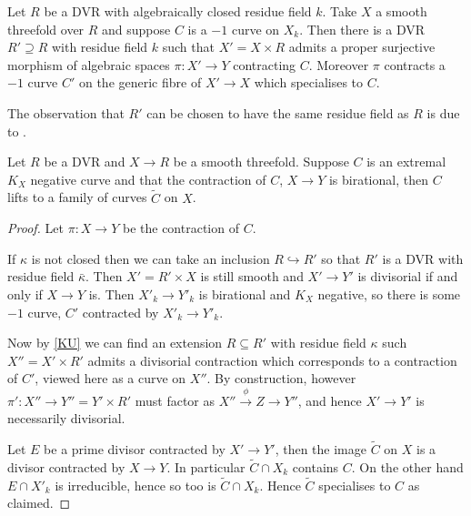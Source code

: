 \documentclass[a4paper,12pt]{amsart}
\begin{document}
	
	\begin{lemma}\cite[Lemma 9.4]{katsura1985elliptic} \label{KU}
		Let $R$ be a DVR with algebraically closed residue field $k$. Take $X$ a smooth threefold over $R$ and suppose $C$ is a $-1$ curve on $X_{k}$. Then there is a DVR $R' \supseteq R$ with residue field $k$ such that $X'=X\times R$ admits a proper surjective morphism of algebraic spaces $\pi:X' \to Y$  contracting $C$. Moreover $\pi$ contracts a $-1$ curve $C'$ on the generic fibre of $X' \to X$ which specialises to $C$.
	\end{lemma}
	
	The observation that $R'$ can be chosen to have the same residue field as $R$ is due to \cite[Lemma 3.6]{egbert2016log}.
	
	\begin{theorem}\label{curves}
		Let $R$ be a DVR and $X \to R$ be a smooth threefold. Suppose $C$ is an extremal $K_{X}$ negative curve and that the contraction of $C$, $X\to Y$ is birational, then $C$ lifts to a family of curves $\tilde{C}$ on $X$. 
	\end{theorem}
	
	\begin{proof}
		
		Let $\pi:X \to Y$ be the contraction of $C$. 
		
		If $\kappa$ is not closed then we can take an inclusion $R \hookrightarrow R'$ so that $R'$ is a DVR with residue field $\bar{\kappa}$. Then $X'=R'\times X$ is still smooth and $X' \to Y'$ is divisorial if and only if $X \to Y$ is. Then $X'_{k} \to Y'_{k}$ is birational and $K_{X}$ negative, so there is some $-1$ curve, $C'$ contracted by $X'_{k} \to Y'_{k}$. 
		
		Now by \autoref{KU} we can find an extension $R \subseteq R'$ with residue field $\kappa$ such $X''=X'\times R'$ admits a divisorial contraction which corresponds to a contraction of $C'$, viewed here as a curve on $X''$. By construction, however $\pi':X'' \to Y''=Y'\times R'$ must factor as $X''\xrightarrow{\phi} Z \to Y''$, and hence $X' \to Y'$ is necessarily divisorial.
		
		Let $E$ be a prime divisor contracted by $X' \to Y'$, then the image $\tilde{C}$ on $X$ is a divisor contracted by $X \to Y$. In particular $\tilde{C} \cap X_{k}$ contains $C$. On the other hand $E\cap X'_{k}$ is irreducible, hence so too is $\tilde{C} \cap X_{k}$. Hence $\tilde{C}$ specialises to $C$ as claimed.

	\end{proof}
\end{document}
